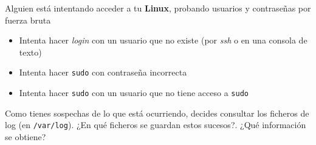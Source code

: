 \newpage
\begin{homeworkProblem}

  \begin{multicols}{2}

    \begin{ActividadHacker}
      Alguien está intentando acceder a tu \textbf{Linux}, probando usuarios y contraseñas por fuerza bruta
      \begin{itemize}
      \item Intenta hacer \textit{login} con un usuario que no existe (por \textit{ssh} o en una consola de texto)
      \item Intenta hacer \texttt{sudo} con contraseña incorrecta
      \item Intenta hacer \texttt{sudo} con un usuario que no tiene acceso a \texttt{sudo}
      \end{itemize}
    \end{ActividadHacker}
    \columnbreak

    \null \vfill

    \begin{ActividadAdmin}
      Como tienes sospechas de lo que está ocurriendo, decides consultar los ficheros de log (en \texttt{/var/log}). ¿En qué ficheros se guardan estos sucesos?. ¿Qué información se obtiene?
    \end{ActividadAdmin}

    \vfill \null

  \end{multicols}


\end{homeworkProblem}



